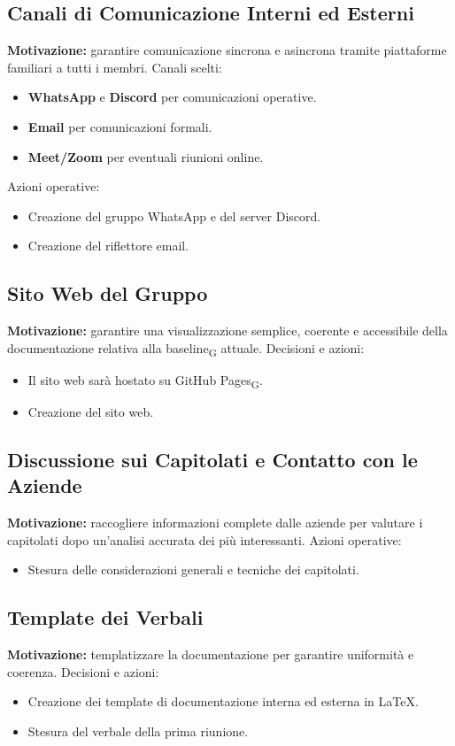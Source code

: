 \subsection{Canali di Comunicazione Interni ed Esterni}
\textbf{Motivazione:} garantire comunicazione sincrona e asincrona tramite piattaforme familiari a tutti i membri.  
Canali scelti:
\begin{itemize}
    \item \textbf{WhatsApp} e \textbf{Discord} per comunicazioni operative.
    \item \textbf{Email} per comunicazioni formali.
    \item \textbf{Meet/Zoom} per eventuali riunioni online.
\end{itemize}
Azioni operative:
\begin{itemize}
    \item Creazione del gruppo WhatsApp e del server Discord.
    \item Creazione del riflettore email.
\end{itemize}

\subsection{Sito Web del Gruppo}
\textbf{Motivazione:} garantire una visualizzazione semplice, coerente e accessibile della documentazione relativa alla baseline\textsubscript{G} attuale.  
Decisioni e azioni:
\begin{itemize}
    \item Il sito web sarà hostato su GitHub Pages\textsubscript{G}.
    \item Creazione del sito web.
\end{itemize}

\subsection{Discussione sui Capitolati e Contatto con le Aziende}
\textbf{Motivazione:} raccogliere informazioni complete dalle aziende per valutare i capitolati dopo un’analisi accurata dei più interessanti.  
Azioni operative:
\begin{itemize}
    \item Stesura delle considerazioni generali e tecniche dei capitolati.
\end{itemize}

\subsection{Template dei Verbali}
\textbf{Motivazione:} templatizzare la documentazione per garantire uniformità e coerenza.  
Decisioni e azioni:
\begin{itemize}
    \item Creazione dei template di documentazione interna ed esterna in LaTeX.
    \item Stesura del verbale della prima riunione.
\end{itemize}

